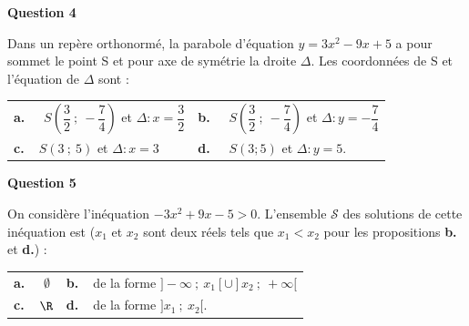 \medskip

\textbf{Question 4}

\medskip 

Dans un repère orthonormé, la parabole d’équation $y=3x^2-9x+5$ a pour sommet le point S et pour axe de symétrie la droite $\Delta$. Les coordonnées de S et l’équation de $\Delta$ sont :

\medskip
\begin{tabularx}{\linewidth}{*{2}{X}}
\textbf{a.~~} $ S\left(\dfrac{3}{2}~;~-\dfrac{7}{4}\right)$ et $\Delta : x=\dfrac{3}{2}$ &\textbf{b.~~} $S\left(\dfrac{3}{2}~;~-\dfrac{7}{4}\right)$ et $\Delta : y=-\dfrac{7}{4}$\\\textbf{c.~~}$ S(3~;~5) $ et $\Delta : x = 3$ & \textbf{d.~~} $S(3 ;5)$ et $\Delta : y = 5$.
\end{tabularx}

\medskip

\textbf{Question 5}

\medskip 

On considère l’inéquation $- 3x^2 + 9x-5 > 0$. L’ensemble $\mathscr{S}$ des solutions de cette inéquation est ($x_1$ et $x_2$ sont deux réels tels que $x_1< x_2 $ pour les propositions \textbf{b.} et \textbf{d.}) :

\medskip

\begin{tabularx}{\linewidth}{*{2}{X}}
\textbf{a.~~} $ \emptyset$ &\textbf{b.~~}de la forme $]-\infty~;~x_1 [ \cup ] x_2~;~+\infty [ $\\\textbf{c.~~}$\R $& \textbf{d.~~}de la forme $  ] x_1~;~x_2 [  $.
\end{tabularx}

\vspace{0.5cm}
